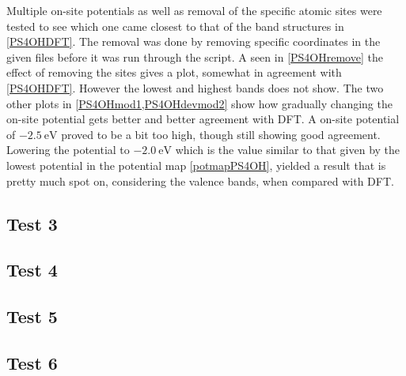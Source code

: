 Multiple on-site potentials as well as removal of the specific atomic sites were tested to see which one came closest to that of the band structures in \cref{PS4OHDFT}. The removal was done by removing specific coordinates in the given files before it was run through the script. A seen in \cref{PS4OHremove} the effect of removing the sites gives a plot, somewhat in agreement with \cref{PS4OHDFT}. However the lowest and highest bands does not show. The two other plots in \cref{PS4OHmod1,PS4OHdevmod2} show how gradually changing the on-site potential gets better and better agreement with DFT. A on-site potential of \(\SI{-2.5}{\electronvolt}\) proved to be a bit too high, though still showing good agreement. Lowering the potential to \(\SI{-2.0}{\electronvolt}\) which is the value similar to that given by the lowest potential in the potential map \cref{potmapPS4OH}, yielded a result that is pretty much spot on, considering the valence bands, when compared with DFT. 
\subsection{Test 3}
\subsection{Test 4}
\subsection{Test 5}
\subsection{Test 6}

